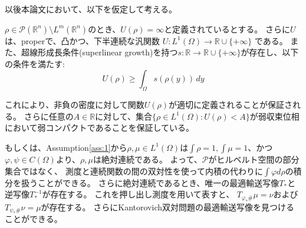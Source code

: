 以後本論文において、以下を仮定して考える。
{\color{red}
\begin{ass}
\label{ass:2}

$\rho \in \mathcal{P}(\mathbb{R}^n) \setminus L^m(\mathbb{R}^n)$のとき、$U(\rho) = \infty$と定義されているとする。
さらに$U$は、properで、凸かつ、下半連続な汎関数 $U: L^1(\Omega) \to \mathbb{R} \cup  \{+ \infty\}$ である。
また、超線形成長条件(superlinear growth)を持つ$s: \mathbb{R} \to \mathbb{R} \cup  \{+ \infty\}$が存在し、以下の条件を満たす$:$
$$
    U(\rho) \geq \int_\Omega s(\rho(y)) \, dy
$$

これにより、非負の密度に対して関数$U(\rho)$が適切に定義されることが保証される。
さらに任意の$A \in \mathbb{R}$に対して、集合$\{ \rho \in L^1(\Omega): U(\rho) < A\}$が弱収束位相において弱コンパクトであることを保証している。

もしくは、Assumption\ref{ass:1}から$\rho, \mu \in L^1(\Omega)$は$\int \rho = 1, \int \mu = 1$、かつ$\varphi, \psi \in C(\Omega)$より、$\rho, \mu$は絶対連続である。
よって、$\mathcal{P}$がヒルベルト空間の部分集合ではなく、
測度と連続関数の間の双対性を使って内積の代わりに$\int \varphi d \rho$の積分を扱うことができる。
さらに絶対連続であるとき、唯一の最適輸送写像$T_*$と逆写像$T_*^{-1}$が存在する。
これを押し出し測度を用いて表すと、
$T_{\varphi_* \#} \mu = \nu$および$T_{\psi_* \#} \nu = \mu$が存在する。
さらにKantorovich双対問題の最適輸送写像を見つけることができる。

\begin{comment}

確率測度 $\mu$ がルベーグ積分に関して絶対連続であるとき、測度 $\mu$ と連続関数 $f$ の積分は、次の式で表されます。

\[
\int_\Omega f(x) \, \mu(dx) = \int_\Omega f(x) \, \rho(x) dx
\]


ここで、$\rho$ は $\mu$ の密度関数です。

この式は、ルベーグ積分と測度の積分の関係から導かれます。

ルベーグ積分では、関数 $f$ がルベーグ可積分であることを条件に、次の式で定義されます。

\[
\int_\Omega f(x) \, dx = \sup \left\{ \sum_{k=1}^\infty \lambda_k f(x_k) \mid \{x_k\} \subset \Omega, \sum_{k=1}^\infty \lambda_k < \infty \right\}
\]

確率測度 $\mu$ がルベーグ積分に関して絶対連続であるとき、$\mu$ の密度関数 $\rho$ は存在し、$\mu(A) = \int_A \rho(x) dx$ が成立します。

したがって、次の等式が成立します。

\[
\int_\Omega f(x) \, \mu(dx) = \int_\Omega f(x) \, \rho(x) dx
\]
この式は、確率測度と連続関数の積分を計算する際によく使用されます。
\end{comment}

\end{ass}
}

